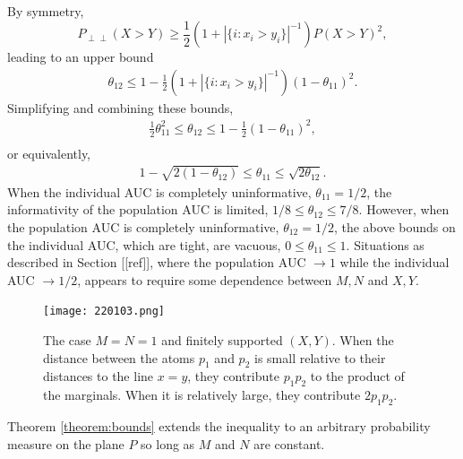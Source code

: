 \message{ !name(manuscript.tex)}\documentclass[12pt]{article}
\DeclareMathOperator{\AUC}{AUC}
\renewcommand{\P}{P}
\newcommand{\cind}{\perp \!\!\! \perp}
\newcommand{\aucindiv}{\theta_{11}}%
\newcommand{\aucpop}{\theta_{12}}%
\begin{document}
By symmetry,
$$
\P_{\cind}(X>Y) \ge \frac{1}{2}(1+|\{i:x_i>y_i\}|^{-1})\P(X>Y)^2,
$$
leading to an upper bound
\begin{align}
  \aucpop \le 1 - \frac{1}{2}(1+|\{i:x_i>y_i\}|^{-1})(1-\aucindiv)^2.
\end{align}
Simplifying and combining these bounds,
\begin{align}
  \frac{1}{2}\aucindiv^2 \le \aucpop \le 1 - \frac{1}{2}(1-\aucindiv)^2,\\
\end{align}
or equivalently,
\begin{align}
  1-\sqrt{2(1-\aucpop)} \le \aucindiv \le \sqrt{2\aucpop}.
\end{align}
When the individual AUC is completely uninformative, $\aucindiv=1/2$,
the informativity of the population AUC is limited,
$1/8 \le \aucpop \le 7/8$. However, when the population AUC is
completely uninformative, $\aucpop=1/2$, the above bounds on the individual AUC, which are tight, are vacuous, $0\le\aucindiv\le 1$. Situations as described in Section [[ref]], where the population AUC $\to 1$ while the individual AUC $\to 1/2$, appears to require some dependence between $M,N$ and $X,Y$. %


\begin{figure}[!tbp]
  \centering
  \texttt{[image: 220103.png]}
  \caption{The case $M=N=1$ and finitely supported $(X,Y)$. When the
    distance between the atoms $p_1$ and $p_2$ is small
    relative to their distances to the line $x=y$, they contribute
    $p_1p_2$ to the product of the marginals. When it is relatively
    large, they contribute $2p_1p_2$.}  \label{fig:inequality}
\end{figure}


Theorem \ref{theorem:bounds} extends the inequality to an arbitrary probability measure on the plane $\P$ so long as $M$ and $N$ are constant.
\end{document}
